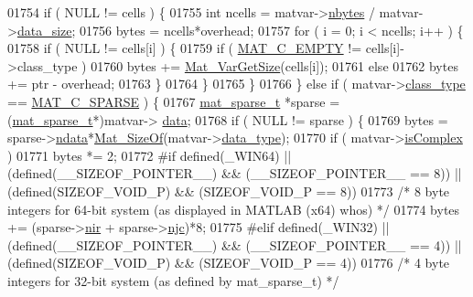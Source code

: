 \begin{DoxyCode}
{{{{{{{{{{{{{{{{{{{{{{{{{{{{{{01754         if ( NULL != cells ) \{
01755             \textcolor{keywordtype}{int} ncells = matvar->\hyperlink{group___m_a_t_abf1c844540503be2df9bb3db93cfe307}{nbytes} / matvar->\hyperlink{group___m_a_t_a9ad1c82e2b568da617e12dc73a26e1f9}{data\_size};
01756             bytes = ncells*overhead;
01757             \textcolor{keywordflow}{for} ( i = 0; i < ncells; i++ ) \{
01758                 \textcolor{keywordflow}{if} ( NULL != cells[i] ) \{
01759                     \textcolor{keywordflow}{if} ( \hyperlink{group___m_a_t_ggad4d60ae7b709fc81bfd744fb4c857c40a5c76eef0ca0373d25abe49053be6fa9a}{MAT\_C\_EMPTY} != cells[i]->class\_type )
01760                         bytes += \hyperlink{group___m_a_t_gaeeb798fead2f765bddfb19016c7fdbcc}{Mat\_VarGetSize}(cells[i]);
01761                     \textcolor{keywordflow}{else}
01762                         bytes += ptr - overhead;
01763                 \}
01764             \}
01765         \}
01766     \} \textcolor{keywordflow}{else} \textcolor{keywordflow}{if} ( matvar->\hyperlink{group___m_a_t_aff13035bf3265dd7d9425e5d40c839d4}{class\_type} == \hyperlink{group___m_a_t_ggad4d60ae7b709fc81bfd744fb4c857c40a0d5655b7e6178a2242cb3bb56ff4c8d2}{MAT\_C\_SPARSE} ) \{
01767         \hyperlink{group___m_a_t_structmat__sparse__t}{mat\_sparse\_t} *sparse = (\hyperlink{group___m_a_t_structmat__sparse__t}{mat\_sparse\_t}*)matvar->
      \hyperlink{group___m_a_t_a5672978efa230bbdecdf38ede781f7fa}{data};
01768         if ( NULL != sparse ) \{
01769             bytes = sparse->\hyperlink{group___m_a_t_a1beb8a8c58a808207cbea650563a9b63}{ndata}*\hyperlink{group__mat__util_gab6774aabdc124c540c1e7686d0804940}{Mat\_SizeOf}(matvar->\hyperlink{group___m_a_t_ab6aafe9bd77f0f077852593dec438144}{data\_type});
01770             \textcolor{keywordflow}{if} ( matvar->\hyperlink{group___m_a_t_aeb03b3a69f108dc05470b00443a43739}{isComplex} )
01771                 bytes *= 2;
01772 \textcolor{preprocessor}{#if defined(\_WIN64) || (defined(\_\_SIZEOF\_POINTER\_\_) && (\_\_SIZEOF\_POINTER\_\_ == 8)) ||
       (defined(SIZEOF\_VOID\_P) && (SIZEOF\_VOID\_P == 8))}
01773             \textcolor{comment}{/* 8 byte integers for 64-bit system (as displayed in MATLAB (x64) whos) */}
01774             bytes += (sparse->\hyperlink{group___m_a_t_aa64636ad57cf87f7a28ff5018437a850}{nir} + sparse->\hyperlink{group___m_a_t_a482d8e4b40aa975f0c1daf146ebe08a4}{njc})*8;
01775 \textcolor{preprocessor}{#elif defined(\_WIN32) || (defined(\_\_SIZEOF\_POINTER\_\_) && (\_\_SIZEOF\_POINTER\_\_ == 4)) ||
       (defined(SIZEOF\_VOID\_P) && (SIZEOF\_VOID\_P == 4))}
01776             \textcolor{comment}{/* 4 byte integers for 32-bit system (as defined by mat\_sparse\_t) */}
}}}}}}}}}}}}}}}}}}}}}}}}}}}}}}
\end{DoxyCode}

